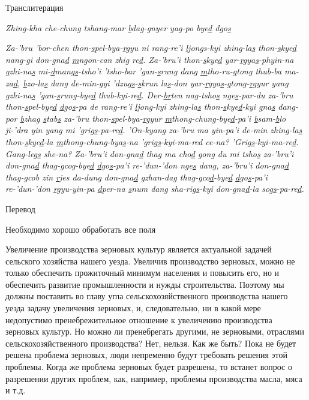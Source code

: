 \begin{center}Транслитерация\end{center}

{\large \emph{Zhing-kha che-chung tshang-mar \ul{b}dag-\ul{g}nyer yag-po bye\ul{d} dgo\ul{s}}}

\emph{
Za-'bru 'bor-chen thon-\ul{s}pel-bya-\ul{r}gyu ni rang-re'i \ul{l}jongs-kyi zhing-la\ul{s} thon-\ul{s}kye\ul{d} nang-gi don-gna\ul{d} \ul{m}ngon-can zhig re\ul{d}.
Za-'bru'i thon-\ul{s}kye\ul{d} yar-\ul{r}gya\ul{s}-phyin-na \ul{g}zhi-na\ul{s} mi-\ul{d}mang\ul{s}-tsho'i 'tsho-bar 'gan-\ul{s}rung dang \ul{m}tho-ru-\ul{g}tong thub-ba ma-za\ul{d},
\ul{b}zo-la\ul{s} dang de-min-gyi 'dzug\ul{s}-\ul{s}krun la\ul{s}-don yar-\ul{r}gya\ul{s}-\ul{g}tong-\ul{r}gyur yang \ul{g}zhi-na\ul{s} 'gan-\ul{s}rung-bye\ul{d} thub-kyi-re\ul{d}.
Der-\ul{br}ten nag-tsho\ul{s} nge\ul{s}-par-du za-'bru thon-\ul{s}pel-bye\ul{d} \ul{d}go\ul{s}-pa de rang-re'i \ul{l}jong-kyi zhing-la\ul{s} thon-\ul{s}kye\ul{d}-kyi \ul{g}na\ul{s} dang-por \ul{b}zhag \ul{s}tab\ul{s} za-'bru thon-\ul{s}pel-bya-\ul{r}gyur \ul{m}thong-chung-bye\ul{d}-pa'i \ul{b}sam-\ul{b}lo ji-'dra yin yang mi 'grig\ul{s}-pa-re\ul{d}.
'On-kyang za-'bru ma yin-pa'i de-min zhing-la\ul{s} thon-\ul{s}kye\ul{d}-la \ul{m}thong-chung-bya\ul{s}-na 'grig\ul{s}-kyi-ma-red ce-na?
'Grig\ul{s}-kyi-ma-re\ul{d}.
Gang-leg\ul{s} she-na?
Za-'bru'i don-\ul{g}na\ul{d} thag ma cho\ul{d} gong du mi tsho\ul{s} za-'bru'i don-\ul{g}na\ul{d} thag-\ul{g}cog-bye\ul{d} \ul{d}go\ul{s}-pa'i re-'dun-'don nge\ul{s} dang,
za-'bru'i don-\ul{g}na\ul{d} thag-\ul{g}cob zin \ul{r}jes da-dung don-\ul{g}na\ul{d} \ul{g}zhan-dag thag-\ul{g}co\ul{d}-bye\ul{d} \ul{d}go\ul{s}-pa'i re-'dun-'don \ul{r}gyu-yin-pa \ul{d}per-na \ul{s}num dang sha-rig\ul{s}-kyi don-\ul{g}na\ul{d}-la sog\ul{s}-pa-re\ul{d}.
}

\begin{center}Перевод\end{center}

Необходимо хорошо обработать все поля

Увеличение производства зерновых культур является актуальной задачей сельского хозяйства нашего уезда. Увеличив производство зерновых, можно не только обеспечить прожиточный минимум населения и повысить его, но и обеспечить развитие промышленности и нужды строительства. Поэтому мы должны поставить во главу угла сельскохозяйственного производства нашего уезда задачу увеличения зерновых, и, следовательно, ни в какой мере недопустимо пренебрежительное отношение к увеличению производства зерновых культур. Но можно ли пренебрегать другими, не зерновыми, отраслями сельскохозяйственного производства? Нет, нельзя. Как же быть? Пока не будет решена проблема зерновых, люди непременно будут требовать решения этой проблемы. Когда же проблема зерновых будет разрешена, то встанет вопрос о разрешении других проблем, как, например, проблемы производства масла, мяса и т.д.

